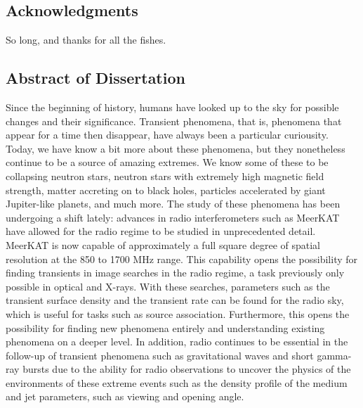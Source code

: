 \documentclass[12pt]{article}
\begin{document}
\doublespacing
\newpage
{} \label{acknowledgements}
\begin{center}
\section*{Acknowledgments}
\end{center}
\vspace*{6pt}
So long, and thanks for all the fishes.
\doublespacing
\newpage
\begin{center}
\section*{Abstract of Dissertation}
\end{center}
 \label{abstract}
\vspace*{-40pt}
\vspace{24pt}
\begin{singlespace}
\end{singlespace}
\vspace{-12pt}
\vspace*{24pt}
Since the beginning of history, humans have looked up to the sky for possible changes and their significance. Transient phenomena, that is, phenomena that appear for a time then disappear, have always been a particular curiousity. Today, we have know a bit more about these phenomena, but they nonetheless continue to be a source of amazing extremes. We know some of these to be collapsing neutron stars, neutron stars with extremely high magnetic field strength, matter accreting on to black holes, particles accelerated by giant Jupiter-like planets, and much more. The study of these phenomena has been undergoing a shift lately: advances in radio interferometers such as MeerKAT have allowed for the radio regime to be studied in unprecedented detail. MeerKAT is now capable of approximately a full square degree of spatial resolution at the 850 to 1700 MHz range. This capability opens the possibility for finding transients in image searches in the radio regime, a task previously only possible in optical and X-rays. With these searches, parameters such as the transient surface density and the transient rate can be found for the radio sky, which is useful for tasks such as source association. Furthermore, this opens the possibility for finding new phenomena entirely and understanding existing phenomena on a deeper level. In addition, radio continues to be essential in the follow-up of transient phenomena such as gravitational waves and short gamma-ray bursts due to the ability for radio observations to uncover the physics of the environments of these extreme events such as the density profile of the medium and jet parameters, such as viewing and opening angle.  
\doublespacing
\newpage
\tableofcontents
\newpage
\cleardoublepage
\end{document}
